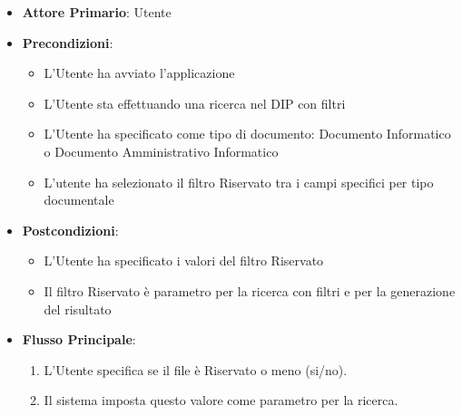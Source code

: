 \begin{itemize}
      \item \textbf{Attore Primario}: Utente
      \item \textbf{Precondizioni}: 
      \begin{itemize}
            \item L'Utente ha avviato l'applicazione
            \item L'Utente sta effettuando una ricerca nel DIP con filtri
            \item L'Utente ha specificato come tipo di documento: Documento Informatico o Documento Amministrativo Informatico
            \item L'utente ha selezionato il filtro Riservato tra i campi specifici per tipo documentale
      \end{itemize}
      \item \textbf{Postcondizioni}: 
      \begin{itemize}
            \item L'Utente ha specificato i valori del filtro Riservato
            \item Il filtro Riservato è parametro per la ricerca con filtri e per la generazione del risultato
      \end{itemize}
      \item \textbf{Flusso Principale}:
      \begin{enumerate}
            \item L'Utente specifica se il file è Riservato o meno (si/no).
            \item Il sistema imposta questo valore come parametro per la ricerca.
      \end{enumerate}
\end{itemize}

